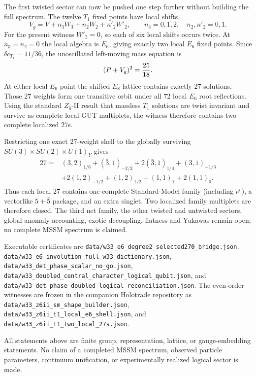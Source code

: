 The first twisted sector can now be pushed one step further without building
the full spectrum.  The twelve \(T_1\) fixed points have local shifts
\[
 V_g=V+n_3W_3+n_2W_2+n'_2W'_2,\qquad
 n_3=0,1,2,\quad n_2,n'_2=0,1.
\]
For the present witness \(W'_2=0\), so each of six local shifts occurs twice.
At \(n_3=n_2=0\) the local algebra is \(E_6\), giving exactly two local
\(E_6\) fixed points.  Since \(\delta c_{T_1}=11/36\), the unoscillated
left-moving mass equation is
\[
 (P+V_g)^2={25\over18}.
\]
At either local \(E_6\) point the shifted \(E_8\) lattice contains exactly
\(27\) solutions.  Those \(27\) weights form one transitive orbit under all
\(72\) local \(E_6\) root reflections.  Using the standard \(Z_6\)-II result
that massless \(T_1\) solutions are twist invariant and survive as complete
local-GUT multiplets, the witness therefore contains two complete localized
\(27\)s.

Restricting one exact \(27\)-weight shell to the globally surviving
\(SU(3)\times SU(2)\times U(1)_Y\) gives
\[
\begin{split}
27={}&(3,2)_{1/6}+(\bar3,1)_{-2/3}
 +2(\bar3,1)_{1/3}+(3,1)_{-1/3}\\
 &+2(1,2)_{-1/2}+(1,2)_{1/2}
 +(1,1)_1+2(1,1)_0.
\end{split}
\]
Thus each local \(27\) contains one complete Standard-Model family
(including \(\nu^c\)), a vectorlike \(5+\bar5\) package, and an extra singlet.
Two localized family multiplets are therefore closed.  The third net family,
the other twisted and untwisted sectors, global anomaly accounting, exotic
decoupling, flatness and Yukawas remain open; no complete MSSM spectrum is
claimed.

Executable certificates are
\texttt{data/w33\_e6\_degree2\_selected270\_bridge.json},
\texttt{data/w33\_e6\_involution\_full\_w33\_dictionary.json},
\texttt{data/w33\_det\_phase\_scalar\_no\_go.json},
\texttt{data/w33\_doubled\_central\_character\_logical\_qubit.json}, and
\texttt{data/w33\_det\_phase\_doubled\_logical\_reconciliation.json}.
The even-order witnesses are frozen in the companion Holotrade repository as
\texttt{data/w33\_z6ii\_sm\_shape\_builder.json},
\texttt{data/w33\_z6ii\_t1\_local\_e6\_shell.json}, and
\texttt{data/w33\_z6ii\_t1\_two\_local\_27s.json}.

All statements above are finite group, representation, lattice, or
gauge-embedding statements.  No claim of a completed MSSM spectrum, observed
particle parameters, continuum unification, or experimentally realized
logical sector is made.
